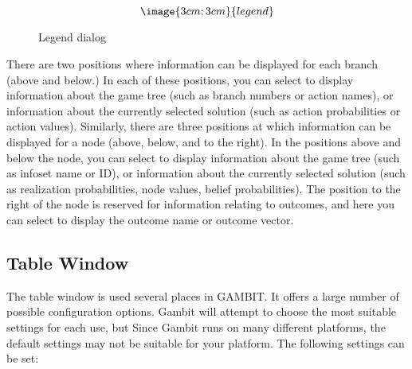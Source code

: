 \begin{figure}
$$\image{3cm;3cm}{legend}$$
\caption{Legend dialog}\label{fig_legend}
\end{figure}

There are two positions where information can be displayed for each
branch (above and below.)  In each of these positions, you can select
to display information about the game tree (such as branch numbers or
action names), or information about the currently selected solution
(such as action probabilities or action values).  Similarly, there are
three positions at which information can be displayed for a node
(above, below, and to the right).  In the positions above and below
the node, you can select to display information about the game tree
(such as infoset name or ID), or information about the currently
selected solution (such as realization probabilities, node values,
belief probabilities). The position to the right of the node is
reserved for information relating to outcomes, and here you can select
to display the outcome name or outcome vector.

\subsection{Table Window}\label{TableWindow}
The table window is used several places in GAMBIT.  It offers a large
number of possible configuration options.  Gambit will attempt to
choose the most suitable settings for each use, but Since Gambit runs
on many different platforms, the default settings may not be suitable
for your platform.  The following settings can be set:

